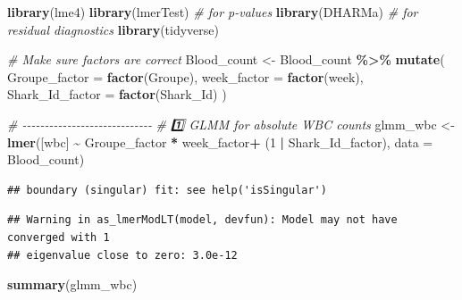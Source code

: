 \documentclass[
]{article}
\newenvironment{Shaded}{\begin{snugshade}}{\end{snugshade}}
\newcommand{\AttributeTok}[1]{\textcolor[rgb]{0.13,0.29,0.53}{#1}}
\newcommand{\CommentTok}[1]{\textcolor[rgb]{0.56,0.35,0.01}{\textit{#1}}}
\newcommand{\DecValTok}[1]{\textcolor[rgb]{0.00,0.00,0.81}{#1}}
\newcommand{\FunctionTok}[1]{\textcolor[rgb]{0.13,0.29,0.53}{\textbf{#1}}}
\newcommand{\NormalTok}[1]{#1}
\newcommand{\OtherTok}[1]{\textcolor[rgb]{0.56,0.35,0.01}{#1}}
\newcommand{\SpecialCharTok}[1]{\textcolor[rgb]{0.81,0.36,0.00}{\textbf{#1}}}
\newcommand{\StringTok}[1]{\textcolor[rgb]{0.31,0.60,0.02}{#1}}
\begin{document}
\begin{Shaded}
\begin{Highlighting}[]
\FunctionTok{library}\NormalTok{(lme4)}
\FunctionTok{library}\NormalTok{(lmerTest)  }\CommentTok{\# for p{-}values}
\FunctionTok{library}\NormalTok{(DHARMa)    }\CommentTok{\# for residual diagnostics}
\FunctionTok{library}\NormalTok{(tidyverse)}

\CommentTok{\# Make sure factors are correct}
\NormalTok{Blood\_count }\OtherTok{\textless{}{-}}\NormalTok{ Blood\_count }\SpecialCharTok{\%\textgreater{}\%}
  \FunctionTok{mutate}\NormalTok{(}
    \AttributeTok{Groupe\_factor =} \FunctionTok{factor}\NormalTok{(Groupe),}
    \AttributeTok{week\_factor =} \FunctionTok{factor}\NormalTok{(week),}
    \AttributeTok{Shark\_Id\_factor =} \FunctionTok{factor}\NormalTok{(Shark\_Id)}
\NormalTok{  )}

\CommentTok{\# {-}{-}{-}{-}{-}{-}{-}{-}{-}{-}{-}{-}{-}{-}{-}{-}{-}{-}{-}{-}{-}{-}{-}{-}{-}{-}{-}{-}{-}}
\CommentTok{\# 1️⃣ GLMM for absolute WBC counts}
\NormalTok{glmm\_wbc }\OtherTok{\textless{}{-}} \FunctionTok{lmer}\NormalTok{(}\StringTok{\textasciigrave{}}\AttributeTok{[wbc]}\StringTok{\textasciigrave{}} \SpecialCharTok{\textasciitilde{}}\NormalTok{ Groupe\_factor }\SpecialCharTok{*}\NormalTok{ week\_factor}\SpecialCharTok{+}\NormalTok{ (}\DecValTok{1} \SpecialCharTok{|}\NormalTok{ Shark\_Id\_factor),}
                 \AttributeTok{data =}\NormalTok{ Blood\_count)}
\end{Highlighting}
\end{Shaded}

\begin{verbatim}
## boundary (singular) fit: see help('isSingular')
\end{verbatim}

\begin{verbatim}
## Warning in as_lmerModLT(model, devfun): Model may not have converged with 1
## eigenvalue close to zero: 3.0e-12
\end{verbatim}

\begin{Shaded}
\begin{Highlighting}[]
\FunctionTok{summary}\NormalTok{(glmm\_wbc)}
\end{Highlighting}
\end{Shaded}
\end{document}
